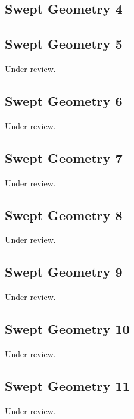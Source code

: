 \documentclass{scrartcl}
\begin{document}
\subsection{Swept Geometry 4} %
\label{sec:swept_4}
\clearpage

\subsection{Swept Geometry 5} %
\label{sec:swept_5}
Under review.%
\clearpage

\subsection{Swept Geometry 6} %
\label{sec:swept_6}
Under review.%
\clearpage

\subsection{Swept Geometry 7} %
\label{sec:swept_7}
Under review.%
\clearpage

\subsection{Swept Geometry 8} %
\label{sec:swept_8}
Under review.%
\clearpage

\subsection{Swept Geometry 9} %
\label{sec:swept_9}
Under review.%
\clearpage

\subsection{Swept Geometry 10} %
\label{sec:swept_10}
Under review.%
\clearpage

\subsection{Swept Geometry 11} %
\label{sec:swept_11}
Under review.%
\clearpage
\end{document}
